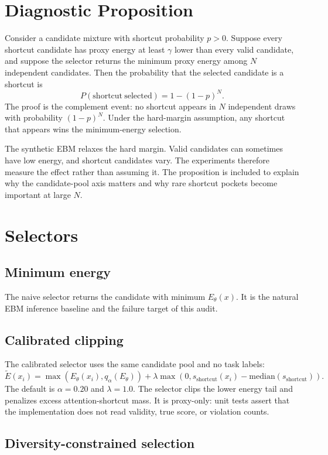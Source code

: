 \documentclass{article}
\newcommand{\energy}{E_\theta}
\newcommand{\short}{s_{\mathrm{shortcut}}}
\begin{document}
\section{Diagnostic Proposition}

Consider a candidate mixture with shortcut probability $p>0$. Suppose every
shortcut candidate has proxy energy at least $\gamma$ lower than every valid
candidate, and suppose the selector returns the minimum proxy energy among
$N$ independent candidates. Then the probability that the selected candidate is
a shortcut is
\[
P(\mathrm{shortcut\ selected}) = 1-(1-p)^N.
\]
The proof is the complement event: no shortcut appears in $N$ independent
draws with probability $(1-p)^N$. Under the hard-margin assumption, any
shortcut that appears wins the minimum-energy selection.

The synthetic EBM relaxes the hard margin. Valid candidates can sometimes have
low energy, and shortcut candidates vary. The experiments therefore measure the
effect rather than assuming it. The proposition is included to explain why the
candidate-pool axis matters and why rare shortcut pockets become important at
large $N$.

\section{Selectors}

\subsection{Minimum energy}

The naive selector returns the candidate with minimum $\energy(x)$. It is the
natural EBM inference baseline and the failure target of this audit.

\subsection{Calibrated clipping}

The calibrated selector uses the same candidate pool and no task labels:
\[
  \tilde E(x_i)=\max(\energy(x_i), q_\alpha(\energy))
  + \lambda\max(0,\short(x_i)-\mathrm{median}(\short)).
\]
The default is $\alpha=0.20$ and $\lambda=1.0$. The selector clips the lower
energy tail and penalizes excess attention-shortcut mass. It is proxy-only:
unit tests assert that the implementation does not read validity, true score,
or violation counts.

\subsection{Diversity-constrained selection}
\end{document}
